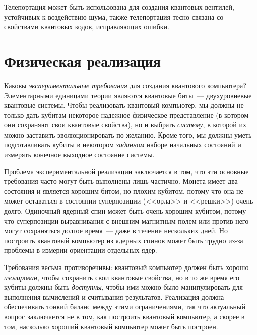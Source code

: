 \begin{multicols}{2}
{        Телепортация может быть использована для создания квантовых вентилей, устойчивых к воздействию шума, также телепортация тесно связана со свойствами квантовых
        кодов, исправляющих ошибки.
    }\\
    \section*{Физическая реализация}
    \normalsize{
        Каковы \emph{экспериментальные требования} для создания квантового компьютера? Элементарными единицами теории являются квантовые биты~--– двухуровневые квантовые системы.
        Чтобы реализовать квантовый компьютер, мы должны не только дать кубитам некоторое надежное физическое представление (в котором они сохраняют свои квантовые свойства), но
        и выбрать \emph{систему}, в которой их можно заставить эволюционировать по желанию. Кроме того, мы
        должны уметь подготавливать кубиты в некотором \emph{заданном} наборе начальных состояний и измерять
        конечное выходное состояние системы.
        
        Проблема экспериментальной реализации заключается в том, что эти основные требования часто могут
        быть выполнены лишь частично. Монета имеет два состояния и является хорошим битом, но плохим кубитом, потому что она не может оставаться в состоянии суперпозиции (<<орла>> и <<решки>>) очень долго.
        Одиночный ядерный спин может быть очень хорошим кубитом, потому что суперпозиции выравнивания
        с внешним магнитным полем или против него могут сохраняться долгое время~--– даже в течение нескольких дней. Но
        построить квантовый компьютер из ядерных спинов может быть трудно из-за проблемы в измерии ориентации отдельных ядер.
    
    Требования весьма противоречивы: квантовый компьютер должен быть
    хорошо \emph{изолирован}, чтобы сохранить свои квантовые свойства, но в то же время его кубиты
    должны быть \emph{доступны}, чтобы ими можно было манипулировать для выполнения вычислений и
    считывания результатов. Реализация должна обеспечивать тонкий баланс между
    этими ограничениями, так что актуальный вопрос заключается не в том, как построить квантовый компьютер,
    а скорее в том, насколько хороший квантовый компьютер может быть построен.
    }\\

\end{multicols}
